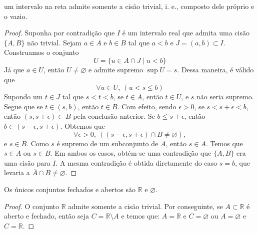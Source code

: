 \begin{prop:intervalos e cisao}
um intervalo na reta admite somente a cisão trivial, i. e., composto dele próprio
e o vazio.
\begin{proof}
	Suponha por contradição que $I$ é um intervalo real que admita uma cisão $\{A, B\}$
	não trivial. Sejam $a \in A$ e $b \in B$ tal que $a<b$ e $J = (a, b) \subset I$.
	Construamos o conjunto
	\[
		U = \{u \in A \cap J \mid u < b \}
	\]
	Já que $a \in U$, então $U \neq \varnothing$ e admite supremo $\sup U = s$. Dessa
	maneira, é válido que
	\[
		\forall u \in U,\ (u < s \leq b)
	\]
	Supondo um $t \in J$ tal que $s < t < b$, se $t \in A$, então $t \in U$, e $s$ não
	seria supremo. Segue que se $t \in (s, b)$, então $t \in B$. Com efeito, sendo $\epsilon > 0$,
	se $s<s+\epsilon<b$, então $(s,s+\epsilon) \subset B$ pela conclusão anterior.
	Se $b \leq s+\epsilon$, então $b \in (s-\epsilon, s+\epsilon)$. Obtemos que
	\[
		\forall \epsilon > 0,\ ( (s-\epsilon,s+\epsilon) \cap B \neq \varnothing ),
	\]
	e $s \in \overline{B}$. Como $s$ é supremo de um subconjunto de $A$, então
	$s \in \overline{A}$. Temos que $s \in A$ ou $s \in B$. Em ambos os casos, obtém-se
	uma contradição que $\{A, B\}$ era uma cisão para $I$. A mesma contradição é obtida
	diretamente do caso $s = b$, que levaria a $\overline{A} \cap B \neq \varnothing$.
\end{proof}
\end{prop:intervalos e cisao}

\begin{cor:fechado e aberto}
Os únicos conjuntos fechados e abertos são $\mathbb{R}$ e $\varnothing$.
\begin{proof}
	O conjunto $\mathbb{R}$ admite somente a cisão trivial. Por conseguinte,
	se $A \subset \mathbb{R}$ é aberto e fechado, então seja $C = \mathbb{R} \setminus A$
	e temos que: $A = \mathbb{R}$ e $C = \varnothing$ ou $A = \varnothing$ e $C = \mathbb{R}$.
\end{proof}
\end{cor:fechado e aberto}
